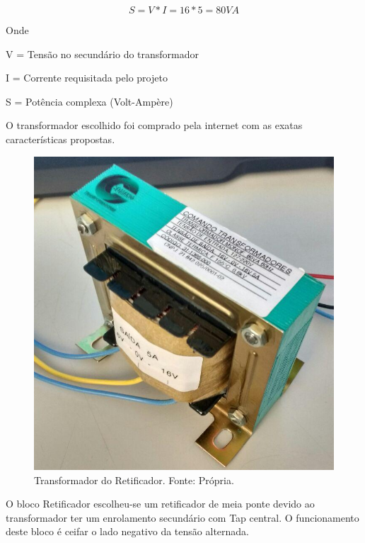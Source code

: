           	  	\begin{equation}
                	S = V*I = 16*5 = 80VA
            	\end{equation}
            	
				Onde
				
				V = Tensão no secundário do transformador
				
				I = Corrente requisitada pelo projeto
				
				S = Potência complexa (Volt-Ampère)

				O transformador escolhido foi comprado pela internet com as exatas 								características propostas.

                \begin{figure}[!htb]
            		\centering
            		\includegraphics[scale= 0.3]{figuras/Transformador.png}
            		\caption{Transformador do Retificador. Fonte: Própria.}
            		\label{transformador-retificador}
            	\end{figure}	
            	
            	O bloco Retificador escolheu-se um retificador de meia ponte devido ao 							transformador ter um enrolamento secundário com Tap central. O funcionamento 					deste bloco é ceifar o lado negativo da tensão alternada. 			

